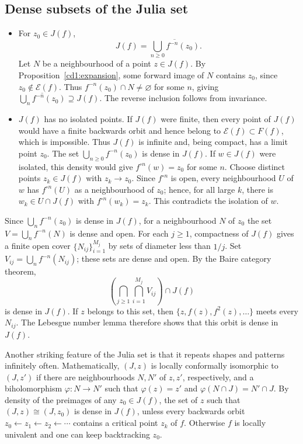 \documentclass[11pt,a4paper]{article}
\begin{document}
\subsection{Dense subsets of the Julia set}
\begin{itemize}
\item For $z_0\in J(f)$,
\[
J(f)=\overline{\bigcup_{n\ge0}f^{-n}(z_0)}.
\]
Let $N$ be a neighbourhood of a point $z\in J(f)$. By Proposition~\ref{cd1:expansion}, some forward image of $N$ contains $z_0$, since $z_0\notin\mathcal E(f)$. Thus $f^{-n}(z_0)\cap N\ne\varnothing$ for some $n$, giving
$\overline{\bigcup_n f^{-n}(z_0)}\supseteq J(f)$. The reverse inclusion follows from invariance.
\item $J(f)$ has no isolated points. If $J(f)$ were finite, then every point of $J(f)$ would have a finite backwards orbit and hence belong to $\mathcal E(f)\subset F(f)$, which is impossible. Thus $J(f)$ is infinite and, being compact, has a limit point $z_0$. The set $\bigcup_{n\ge0}f^{-n}(z_0)$ is dense in $J(f)$. If $w\in J(f)$ were isolated, this density would give $f^{\circ n}(w)=z_0$ for some $n$. Choose distinct points $z_k\in J(f)$ with $z_k\to z_0$. Since $f^{\circ n}$ is open, every neighbourhood $U$ of $w$ has $f^{\circ n}(U)$ as a neighbourhood of $z_0$; hence, for all large $k$, there is $w_k\in U\cap J(f)$ with $f^{\circ n}(w_k)=z_k$. This contradicts the isolation of $w$.
\end{itemize}
\begin{remark}
Since $\bigcup_n f^{-n}(z_0)$ is dense in $J(f)$, for a neighbourhood $N$ of $z_0$ the set $V=\bigcup_n f^{-n}(N)$ is dense and open. For each $j\ge1$, compactness of $J(f)$ gives a finite open cover $\{N_{ij}\}_{i=1}^{M_j}$ by sets of diameter less than $1/j$. Set $V_{ij}=\bigcup_n f^{-n}(N_{ij})$; these sets are dense and open. By the Baire category theorem,
\[
\left(\bigcap_{j\ge1}\bigcap_{i=1}^{M_j}V_{ij}\right)\cap J(f)
\]
is dense in $J(f)$. If $z$ belongs to this set, then $\{z,f(z),f^2(z),\ldots\}$ meets every $N_{ij}$. The Lebesgue number lemma therefore shows that this orbit is dense in $J(f)$.
\end{remark}
\begin{remark}
Another striking feature of the Julia set is that it repeats shapes and patterns infinitely often. Mathematically, $(J,z)$ is locally conformally isomorphic to $(J,z')$ if there are neighbourhoods $N,N'$ of $z,z'$, respectively, and a biholomorphism $\varphi\colon N\to N'$ such that $\varphi(z)=z'$ and $\varphi(N\cap J)=N'\cap J$.
By density of the preimages of any $z_0\in J(f)$, the set of $z$ such that $(J,z)\cong(J,z_0)$ is dense in $J(f)$, unless every backwards orbit $z_0\leftarrow z_1\leftarrow z_2\leftarrow\cdots$ contains a critical point $z_k$ of $f$. Otherwise $f$ is locally univalent and one can keep backtracking $z_0$.
\end{remark}


\end{document}

